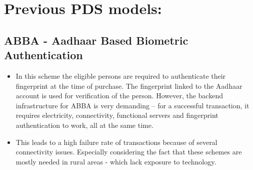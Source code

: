 \documentclass[a4paper,11pt]{article}
\begin{document}
\section{Previous PDS models:}

\subsection{ABBA - Aadhaar Based Biometric Authentication}
\begin{itemize}
    \item In this scheme the eligible persons are required to authenticate their fingerprint at the time of purchase. The fingerprint linked to the Aadhaar account is used for verification of the person. However, the backend infrastructure for ABBA is very demanding – for a successful transaction, it requires electricity, connectivity, functional servers and fingerprint authentication to work, all at the same time.

    \item This leads to a high failure rate of transactions because of several connectivity issues. Especially considering the fact that these schemes are mostly needed in rural areas - which lack exposure to technology. 
    
\end{itemize}
\end{document}
